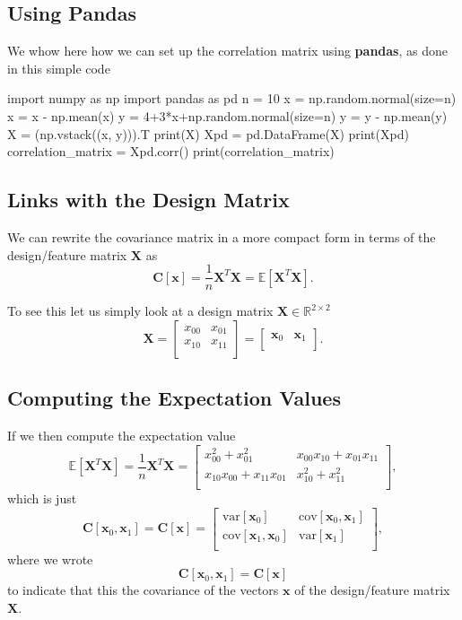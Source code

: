 \documentclass[%
oneside,                 %
final,                   %
10pt]{article}
\begin{document}
\subsection{Using Pandas}

We whow here how we can set up the correlation matrix using \textbf{pandas}, as done in this simple code














\bpycod
import numpy as np
import pandas as pd
n = 10
x = np.random.normal(size=n)
x = x - np.mean(x)
y = 4+3*x+np.random.normal(size=n)
y = y - np.mean(y)
X = (np.vstack((x, y))).T
print(X)
Xpd = pd.DataFrame(X)
print(Xpd)
correlation_matrix = Xpd.corr()
print(correlation_matrix)

\epycod


\subsection{Links with the Design Matrix}

We can rewrite the covariance matrix in a more compact form in terms of the design/feature matrix $\bm{X}$ as 
\[
\bm{C}[\bm{x}] = \frac{1}{n}\bm{X}^T\bm{X}= \mathbb{E}[\bm{X}^T\bm{X}].
\]

To see this let us simply look at a design matrix $\bm{X}\in {\mathbb{R}}^{2\times 2}$
\[
\bm{X}=\begin{bmatrix}
x_{00} & x_{01}\\
x_{10} & x_{11}\\
\end{bmatrix}=\begin{bmatrix}
\bm{x}_{0} & \bm{x}_{1}\\
\end{bmatrix}.
\]

\subsection{Computing the Expectation Values}

If we then compute the expectation value
\[
\mathbb{E}[\bm{X}^T\bm{X}] = \frac{1}{n}\bm{X}^T\bm{X}=\begin{bmatrix}
x_{00}^2+x_{01}^2 & x_{00}x_{10}+x_{01}x_{11}\\
x_{10}x_{00}+x_{11}x_{01} & x_{10}^2+x_{11}^2\\
\end{bmatrix},
\]
which is just 
\[
\bm{C}[\bm{x}_0,\bm{x}_1] = \bm{C}[\bm{x}]=\begin{bmatrix} \mathrm{var}[\bm{x}_0] & \mathrm{cov}[\bm{x}_0,\bm{x}_1] \\
                              \mathrm{cov}[\bm{x}_1,\bm{x}_0] & \mathrm{var}[\bm{x}_1] \\
             \end{bmatrix},
\]
where we wrote $$\bm{C}[\bm{x}_0,\bm{x}_1] = \bm{C}[\bm{x}]$$ to indicate that this the covariance of the vectors $\bm{x}$ of the design/feature matrix $\bm{X}$.
\end{document}
